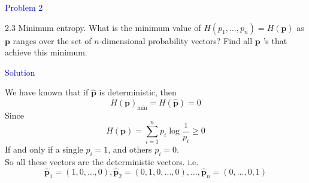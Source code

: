 \textcolor{blue}{Problem 2}

2.3 Minimum entropy. What is the minimum value of $H\left(p_1, \ldots, p_n\right)=H(\mathbf{p})$ as $\mathbf{p}$ ranges over the set of $n$-dimensional probability vectors? Find all $\mathbf{p}$ 's that achieve this minimum.

\textcolor{blue}{Solution}

We have known that if $\mathbf{\hat{p}}$ is deterministic, then
$$H(\mathbf{p})_{\text{min}}=H(\mathbf{\hat{p}})=0$$
Since
$$H(\mathbf{p})=\sum_{i=1}^np_i\log\dfrac{1}{p_i}\geq 0$$
If and only if a single $p_i=1$, and others $p_i=0$.\\
So all these vectors are the deterministic vectors.
i.e.
$$\mathbf{\hat{p}}_1=(1,0,\ldots,0), \mathbf{\hat{p}}_2=(0,1,0,\ldots,0), \ldots, \mathbf{\hat{p}}_n=(0,\ldots,0,1)$$

\newpage
